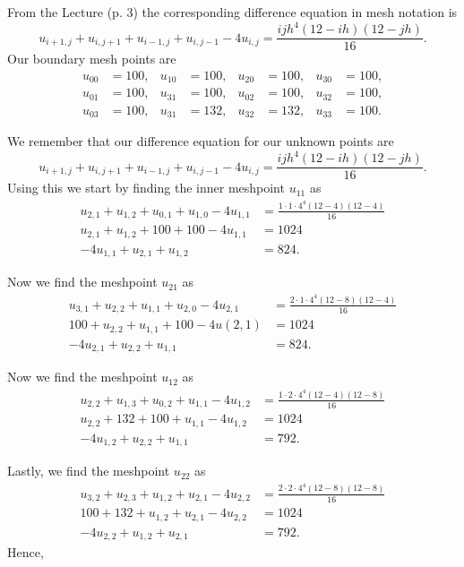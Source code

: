 \begin{derivation}
  From the Lecture (p. 3) the corresponding difference equation in mesh notation is
  \begin{equation*}
   u_{i+1, j} + u_{i, j+1} + u_{i-1, j} + u_{i, j-1} - 4u_{i,j} = \frac{ijh^{4}(12-ih) (12-jh)}{16}
  .\end{equation*}
  Our boundary mesh points are
  \begin{align*}
    u_{00} &= 100, & u_{10} &= 100, & u_{20} &= 100, & u_{30} &= 100, \\
    u_{01} &= 100, & u_{31} &= 100, & u_{02} &= 100, & u_{32} &= 100, \\
    u_{03} &= 100, & u_{31} &= 132, & u_{32} &= 132, & u_{33} &= 100
  .\end{align*}

  We remember that our difference equation for our unknown points are
  \begin{equation*}
    u_{i+1, j} + u_{i, j+1} + u_{i-1, j} + u_{i, j-1} - 4u_{i,j} = \frac{ijh^{4} (12-ih) (12-jh)}{16}
  .\end{equation*}
  Using this we start by finding the inner meshpoint $u_{11}$ as
  \begin{align*}
    u_{2, 1} + u_{1,2} + u_{0,1} + u_{1,0} - 4u_{1,1} &= \frac{1 \cdot 1 \cdot 4^{4} (12 - 4) (12- 4)}{16} \\
    u_{2,1} + u_{1,2} + 100 + 100 - 4u_{1,1}&= 1024  \\
     - 4u_{1,1} + u_{2,1} + u_{1,2} &= 824
  .\end{align*}

  Now we find the meshpoint $u_{21}$ as
  \begin{align*}
    u_{3,1} + u_{2,2} + u_{1,1} + u_{2,0} - 4u_{2,1} &= \frac{2 \cdot 1 \cdot 4^{4} (12 - 8) (12- 4)}{16} \\
    100 + u_{2,2} + u_{1,1} + 100 - 4u(2,1) &= 1024 \\
     - 4u_{2,1} + u_{2,2} + u_{1,1} &= 824
  .\end{align*}

  Now we find the meshpoint $u_{12}$ as
  \begin{align*}
    u_{2,2} + u_{1,3} + u_{0,2} + u_{1,1} - 4u_{1,2} &= \frac{1 \cdot 2 \cdot 4^{4} (12 - 4) (12-8)}{16} \\
    u_{2,2} + 132 + 100 + u_{1,1} - 4u_{1,2} &= 1024 \\
    -4 u_{1,2} + u_{2,2} + u_{1,1} &= 792
  .\end{align*}
  
  Lastly, we find the meshpoint $u_{22}$ as
  \begin{align*}
    u_{3,2} + u_{2,3} + u_{1,2} + u_{2,1} - 4u_{2,2} &= \frac{2 \cdot 2 \cdot 4^{4} (12 - 8) (12-8)}{16} \\
    100 + 132 + u_{1,2} + u_{2,1} - 4u_{2,2} &= 1024 \\
    -4 u_{2,2} + u_{1,2} + u_{2,1} &= 792
  .\end{align*}
  Hence,
\end{derivation}

